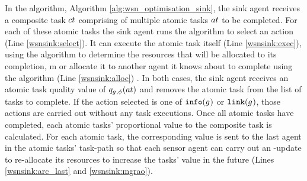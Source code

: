 In the \acronymWSNOptimisationSink{}{} algorithm, Algorithm \ref{alg:wsn_optimisation_sink}, the sink agent receives a composite task $\varCompositeTask{}{}$ comprising of multiple atomic tasks $\varAtomicTask{}{}$ to be completed. For each of these atomic tasks the sink agent runs the \acronymATARIA{}{} algorithm to select an action (Line \ref{wsnsink:select}). It can execute the atomic task itself (Line \ref{wsnsink:exec}), using the \acronymMGRAO{}{} algorithm to determine the resources that will be allocated to its completion,   m or allocate it to another agent it knows about to complete using the \acronymWSNOptimisationArc{}{} algorithm (Line \ref{wsnsink:alloc}) . In both cases, the sink agent receives an atomic task quality value of $\functionAtomicTaskQualitySignature{}{}$ and removes the atomic task from the list of tasks to complete. If the action selected is one of $\texttt{info}(g_{}^{})$ or $\texttt{link}(g_{}^{})$, those actions are carried out without any task executions. Once all atomic tasks have completed, each atomic tasks' proportional value to the composite task is calculated. For each atomic task, the corresponding value is sent to the last agent in the atomic tasks' task-path so that each sensor agent can carry out an \acronymMGRAO{}{}-update to re-allocate its resources to increase the tasks' value in the future (Lines \ref{wsnsink:arc_last} and \ref{wsnsink:mgrao}). 

